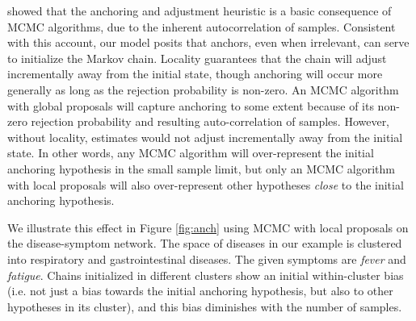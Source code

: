 \citet{lieder2017anchoring} showed that the anchoring and adjustment heuristic is a basic consequence of MCMC algorithms, due to the inherent autocorrelation of samples. Consistent with this account, our model posits that anchors, even when irrelevant, can serve to initialize the Markov chain. Locality guarantees that the chain will adjust incrementally away from the initial state, though anchoring will occur more generally as long as the rejection probability is non-zero. An MCMC algorithm with global proposals will capture anchoring to some extent because of its non-zero rejection probability and resulting auto-correlation of samples. However, without locality, estimates would not adjust incrementally away from the initial state. In other words, any MCMC algorithm will over-represent the initial anchoring hypothesis in the small sample limit, but only an MCMC algorithm with local proposals will also over-represent other hypotheses \textit{close} to the initial anchoring hypothesis.

We illustrate this effect in Figure \ref{fig:anch} using MCMC with local proposals on the disease-symptom network. The space of diseases in our example is clustered into respiratory and gastrointestinal diseases. The given symptoms are \textit{fever} and \textit{fatigue}. Chains initialized in different clusters show an initial within-cluster bias (i.e. not just a bias towards the initial anchoring hypothesis, but also to other hypotheses in its cluster), and this bias diminishes with the number of samples.

